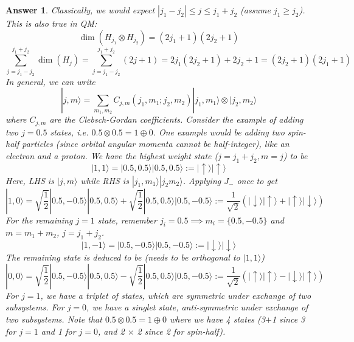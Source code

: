 \documentclass[a4paper]{article}
\newtheorem{ans}{Answer}[subsection]
\theoremstyle{new}
\begin{document}
\begin{ans}
Classically, we would expect $|j_1-j_2|\leq j\leq j_1+j_2$ (assume $j_1\geq j_2$). This is also true in QM: 
$$\dim(H_{j_1}\otimes H_{j_2})=(2j_1+1)(2j_2+1)$$
$$\sum_{j=j_1-j_2}^{j_1+j_2}\dim(H_j)=\sum_{j=j_1-j_2}^{j_1+j_2}(2j+1)=2j_1(2j_2+1)+2j_2+1=(2j_2+1)(2j_1+1)$$
In general, we can write 
$$|j,m\rangle=\sum_{m_1,m_2}C_{j,m}(j_1,m_1;j_2,m_2)|j_1,m_1\rangle\otimes|j_2,m_2\rangle$$
where $C_{j,m}$ are the Clebsch-Gordan coefficients. Consider the example of adding two $j=0.5$ states, i.e.  $0.5\otimes0.5=1\oplus0$. One example would be adding two spin-half particles (since orbital angular momenta cannot be half-integer), like an electron and a proton. We have the highest weight state ($j=j_1+j_2,m=j$) to be $$|1,1\rangle=|0.5,0.5\rangle|0.5,0.5\rangle:=|\uparrow\rangle|\uparrow\rangle$$ 
Here, LHS is $|j,m\rangle$ while RHS is $|j_1,m_1\rangle|j_2m_2\rangle$. Applying $J_-$ once to get $$|1,0\rangle=\sqrt{\frac{1}{2}}|0.5,-0.5\rangle|0.5,0.5\rangle+\sqrt{\frac{1}{2}}|0.5,0.5\rangle|0.5,-0.5\rangle:=\frac{1}{\sqrt{2}}(|\downarrow\rangle|\uparrow\rangle+|\uparrow\rangle|\downarrow\rangle)$$
For the remaining $j=1$ state, remember $j_i=0.5\implies m_i=\{0.5,-0.5\}$ and $m=m_1+m_2$, $j=j_1+j_2$.
$$|1,-1\rangle=|0.5,-0.5\rangle|0.5,-0.5\rangle:=|\downarrow\rangle|\downarrow\rangle$$ 
The remaining state is deduced to be (needs to be orthogonal to $|1,1\rangle$)
$$|0,0\rangle=\sqrt{\frac{1}{2}}|0.5,-0.5\rangle|0.5,0.5\rangle-\sqrt{\frac{1}{2}}|0.5,0.5\rangle|0.5,-0.5\rangle:=\frac{1}{\sqrt{2}}(|\uparrow\rangle|\uparrow\rangle-|\downarrow\rangle|\uparrow\rangle)$$
For $j=1$, we have a triplet of states, which are symmetric under exchange of two subsystems. For $j=0$, we have a singlet state, anti-symmetric under exchange of two subsystems. Note that $0.5\otimes0.5=1\oplus0$ where we have 4 states (3$+$1 since 3 for $j=1$ and 1 for $j=0$, and 2 $\times$ 2 since 2 for spin-half).
\end{ans}
\newpage
\end{document}
